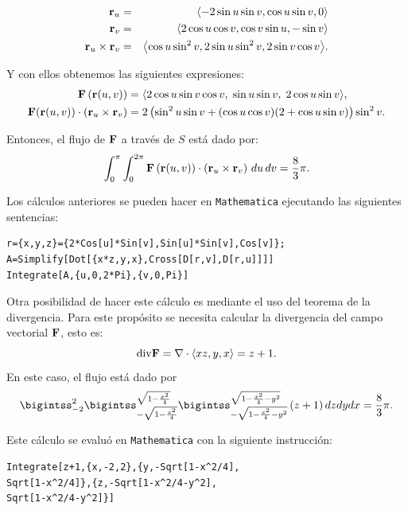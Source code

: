 \begin{eqnarray*}
{\bf r}_{u} &=& \left\langle -2\sin u\sin v,\cos u\sin v,0\right\rangle  \\
{\bf r}_{v} &=& \left\langle 2\cos u\cos v,\cos v\sin u,-\sin v\right\rangle \\
{\bf r}_{u}\times {\bf r}_{v}&=&  \left\langle \cos u\sin ^{2}v,2\sin u\sin^{2}v,2\sin v\cos v\right\rangle\!.
\end{eqnarray*}

Y con ellos obtenemos las siguientes expresiones:
{\small
\begin{align*}
{\bf F}\left( {\bf r}(u,v) \right) &=
\left\langle
2\cos u \sin v \cos v,\;
\sin u \sin v,\;
2\cos u \sin v
\right\rangle\!, \\
{\bf F}({\bf r}(u,v)) \cdot ({\bf r}_{u} \times {\bf r}_{v}) &=
2\left(
\sin^{2} u \sin v + (\cos u \cos v)(2 + \cos u \sin v)
\right) \sin^{2} v.
\end{align*}
}

Entonces, el flujo de ${\bf F}$ a través de $S$ está dado por:
\[
\int_{0}^{\pi} \int_{0}^{2\pi}
{\bf F}\left( {\bf r}(u,v) \right) \cdot \left({\bf r}_{u} \times {\bf r}_{v}\right)
\, du\, dv = \frac{8}{3}\pi.
\]

Los cálculos anteriores se pueden hacer en \verb|Mathematica| ejecutando las siguientes sentencias:

\begin{tcolorbox}[title=\bf Instrucción \verb"Mathematica"]\begin{Verbatim}[formatcom=\letraverbatim]
r={x,y,z}={2*Cos[u]*Sin[v],Sin[u]*Sin[v],Cos[v]};
A=Simplify[Dot[{x*z,y,x},Cross[D[r,v],D[r,u]]]]
Integrate[A,{u,0,2*Pi},{v,0,Pi}]
\end{Verbatim}
\end{tcolorbox}

Otra posibilidad de hacer este cálculo es mediante el uso del teorema de la divergencia.
Para este propósito se necesita calcular la divergencia del campo vectorial ${\bf F}$, esto es:
\[{\rm div}{\bf F}=\nabla \cdot \langle xz,y,x\rangle = z+1.\]
En este caso, el flujo está dado por
{\small
\[\bigintss_{-2}^{2}\bigintss_{-\sqrt{1-\frac{x^{2}}{4}}}^{\sqrt{1-\frac{x^{2}}{4}}}\bigintss_{-\sqrt{1-\frac{x^{2}}{4}-y^{2}}}^{\sqrt{1-\frac{x^{2}}{4}-y^{2}}}\left( z+1\right)dzdydx= \frac{8}{3}\pi.\]
}

Este cálculo se evaluó en \verb"Mathematica" con la siguiente instrucción:

\begin{tcolorbox}[title=\bf Instrucción \verb"Mathematica"]\begin{Verbatim}[formatcom=\letraverbatim]
Integrate[z+1,{x,-2,2},{y,-Sqrt[1-x^2/4],
Sqrt[1-x^2/4]},{z,-Sqrt[1-x^2/4-y^2],
Sqrt[1-x^2/4-y^2]}]
\end{Verbatim}
\end{tcolorbox}

